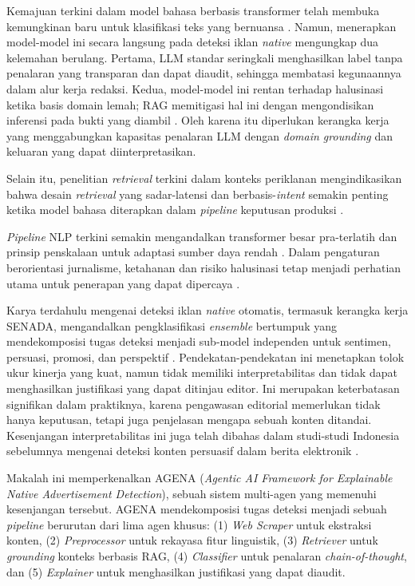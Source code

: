\documentclass{ieeeaccess}
\begin{document}
Kemajuan terkini dalam model bahasa berbasis transformer telah membuka kemungkinan baru untuk klasifikasi teks yang bernuansa \cite{b23, b39}. Namun, menerapkan model-model ini secara langsung pada deteksi iklan \textit{native} mengungkap dua kelemahan berulang. Pertama, LLM standar seringkali menghasilkan label tanpa penalaran yang transparan dan dapat diaudit, sehingga membatasi kegunaannya dalam alur kerja redaksi. Kedua, model-model ini rentan terhadap halusinasi ketika basis domain lemah; RAG memitigasi hal ini dengan mengondisikan inferensi pada bukti yang diambil \cite{b25}. Oleh karena itu diperlukan kerangka kerja yang menggabungkan kapasitas penalaran LLM dengan \textit{domain grounding} dan keluaran yang dapat diinterpretasikan.

Selain itu, penelitian \textit{retrieval} terkini dalam konteks periklanan mengindikasikan bahwa desain \textit{retrieval} yang sadar-latensi dan berbasis-\textit{intent} semakin penting ketika model bahasa diterapkan dalam \textit{pipeline} keputusan produksi \cite{b22}.

\textit{Pipeline} NLP terkini semakin mengandalkan transformer besar pra-terlatih dan prinsip penskalaan untuk adaptasi sumber daya rendah \cite{b15, b39}. Dalam pengaturan berorientasi jurnalisme, ketahanan dan risiko halusinasi tetap menjadi perhatian utama untuk penerapan yang dapat dipercaya \cite{b50, b55}.

Karya terdahulu mengenai deteksi iklan \textit{native} otomatis, termasuk kerangka kerja SENADA, mengandalkan pengklasifikasi \textit{ensemble} bertumpuk yang mendekomposisi tugas deteksi menjadi sub-model independen untuk sentimen, persuasi, promosi, dan perspektif \cite{b17, b19}. Pendekatan-pendekatan ini menetapkan tolok ukur kinerja yang kuat, namun tidak memiliki interpretabilitas dan tidak dapat menghasilkan justifikasi yang dapat ditinjau editor. Ini merupakan keterbatasan signifikan dalam praktiknya, karena pengawasan editorial memerlukan tidak hanya keputusan, tetapi juga penjelasan mengapa sebuah konten ditandai. Kesenjangan interpretabilitas ini juga telah dibahas dalam studi-studi Indonesia sebelumnya mengenai deteksi konten persuasif dalam berita elektronik \cite{b21}.

Makalah ini memperkenalkan AGENA (\textit{Agentic AI Framework for Explainable Native Advertisement Detection}), sebuah sistem multi-agen yang memenuhi kesenjangan tersebut. AGENA mendekomposisi tugas deteksi menjadi sebuah \textit{pipeline} berurutan dari lima agen khusus: (1) \textit{Web Scraper} untuk ekstraksi konten, (2) \textit{Preprocessor} untuk rekayasa fitur linguistik, (3) \textit{Retriever} untuk \textit{grounding} konteks berbasis RAG, (4) \textit{Classifier} untuk penalaran \textit{chain-of-thought}, dan (5) \textit{Explainer} untuk menghasilkan justifikasi yang dapat diaudit.
\end{document}
